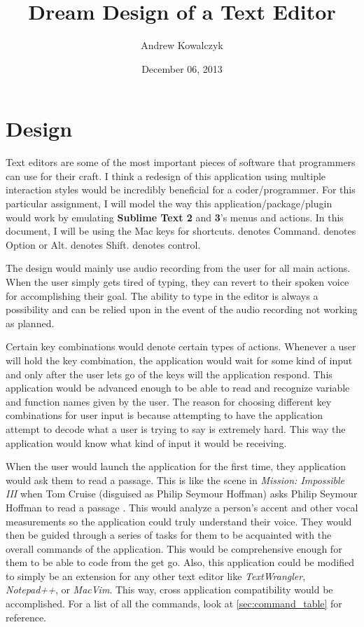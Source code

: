 \documentclass[11pt, oneside]{article}
\title{Dream Design of a Text Editor}
\author{Andrew Kowalczyk}
\date{December 06, 2013}
\begin{document}
\maketitle


\section{Design}

Text editors are some of the most important pieces of software that programmers can use for their craft. I think a redesign of this application using multiple interaction styles would be incredibly beneficial for a coder/programmer. For this particular assignment, I will model the way this application/package/plugin would work by emulating \textbf{Sublime Text 2} and \textbf{3}'s menus and actions. In this document, I will be using the Mac keys for shortcuts. \keys{\cmd} denotes Command. \keys{\Alt} denotes Option or Alt. \keys{\shift} denotes Shift. \keys{\ctrl} denotes control.

The design would mainly use audio recording from the user for all main actions. When the user simply gets tired of typing, they can revert to their spoken voice for accomplishing their goal. The ability to type in the editor is always a possibility and can be relied upon in the event of the audio recording not working as planned.

Certain key combinations would denote certain types of actions. Whenever a user will hold the key combination, the application would wait for some kind of input and only after the user lets go of the keys will the application respond. This application would be advanced enough to be able to read and recognize variable and function names given by the user. The reason for choosing different key combinations for user input is because attempting to have the application attempt to decode what a user is trying to say is extremely hard. This way the application would know what kind of input it would be receiving.

When the user would launch the application for the first time, they application would ask them to read a passage. This is like the scene in \textit{Mission: Impossible III} when Tom Cruise (disguised as Philip Seymour Hoffman) asks Philip Seymour Hoffman to read a passage \cite{mission-impossible}. This would analyze a person's accent and other vocal measurements so the application could truly understand their voice. They would then be guided through a series of tasks for them to be acquainted with the overall commands of the application. This would be comprehensive enough for them to be able to code from the get go. Also, this application could be modified to simply be an extension for any other text editor like \textit{TextWrangler}, \textit{Notepad++}, or \textit{MacVim}. This way, cross application compatibility would be accomplished. 
	For a list of all the commands, look at \ref{sec:command_table} for reference. 
\end{document}
